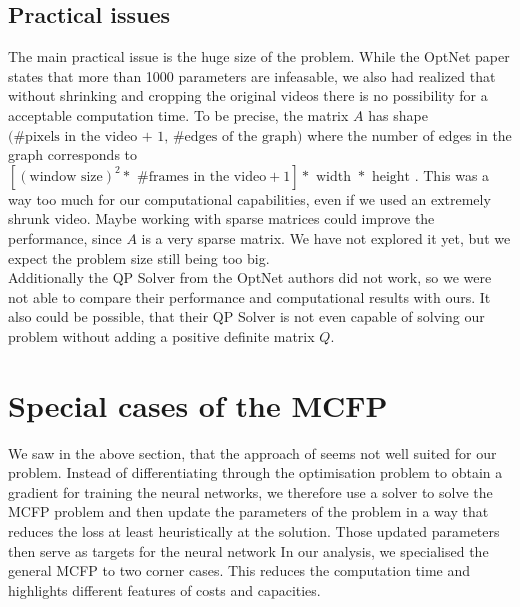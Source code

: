 \documentclass{article}
\begin{document}
{\subsection{Practical issues}

The main practical issue is the huge size of the problem. While the OptNet paper states that more than 1000 parameters are infeasable, we also had realized that without shrinking and cropping the original videos there is no possibility for a acceptable computation time. To be precise, the matrix $A$ has shape $ \big(\text{\# pixels in the video + 1, \# edges of the graph}\big)$
where the number of edges in the graph corresponds to $[(\text{window size})^2  * \text{ \# frames in the video} + 1]* \text{ width } * \text{ height }.$ This was a way too much for our computational capabilities, even if we used an extremely shrunk video. 
Maybe working with sparse matrices could improve the performance, since $A$ is a very sparse matrix. We have not explored it yet, but we expect the problem size still being too big.\\
Additionally the QP Solver from the OptNet authors did not work, so we were not able to compare their performance and computational results with ours. It also could be possible, that their QP Solver is not even capable of solving our problem without adding a positive definite matrix $Q$.

\section{Special cases of the MCFP}
We saw in the above section, that the approach of \cite{AmosK17} seems not well suited for our problem. Instead of differentiating through the optimisation problem to obtain a gradient for training the neural networks, we therefore use a solver to solve the MCFP problem and then update the parameters of the problem in a way that reduces the loss at least heuristically at the solution. Those updated parameters then serve as targets for the neural network In our analysis, we specialised the general MCFP to two corner cases. This reduces the computation time and highlights different features of costs and capacities.


}
\end{document}
